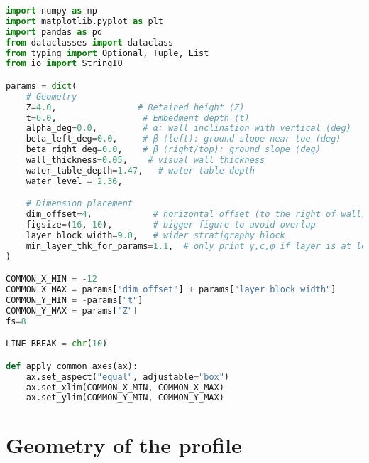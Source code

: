 \begin{lstlisting}[language=Python]
import numpy as np
import matplotlib.pyplot as plt
import pandas as pd
from dataclasses import dataclass
from typing import Optional, Tuple, List
from io import StringIO

params = dict(
    # Geometry
    Z=4.0,                # Retained height (Z)
    t=6.0,                 # Embedment depth (t)
    alpha_deg=0.0,         # α: wall inclination with vertical (deg)
    beta_left_deg=0.0,     # β (left): ground slope near toe (deg)
    beta_right_deg=0.0,    # β (right/top): ground slope (deg)
    wall_thickness=0.05,    # visual wall thickness
    water_table_depth=1.47,   # water table depth
    water_level = 2.36,

    # Dimension placement
    dim_offset=4,            # horizontal offset (to the right of wall) for Z and t dimensions
    figsize=(16, 10),        # bigger figure to avoid overlap      
    layer_block_width=9.0,   # wider stratigraphy block
    min_layer_thk_for_params=1.1,  # only print γ,c,φ if layer is at least this thick [m]
)

COMMON_X_MIN = -12
COMMON_X_MAX = params["dim_offset"] + params["layer_block_width"]
COMMON_Y_MIN = -params["t"]
COMMON_Y_MAX = params["Z"]
fs=8

LINE_BREAK = chr(10)

def apply_common_axes(ax):
    ax.set_aspect("equal", adjustable="box")
    ax.set_xlim(COMMON_X_MIN, COMMON_X_MAX)
    ax.set_ylim(COMMON_Y_MIN, COMMON_Y_MAX)
\end{lstlisting}

\section{Geometry of the profile}

